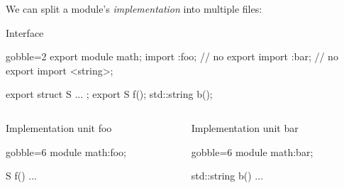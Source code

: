 \begin{frame}[fragile,shrink=5]
  \begin{block}{}
    We can split a module's \emph{implementation} into multiple files:
  \end{block}
  \begin{exampleblock}{Interface}
    \begin{cppcode*}{gobble=2}
      export module math;
      import :foo; // no export
      import :bar; // no export
      import <string>;

      export struct S { ... };
      export S f();
      std::string b();
    \end{cppcode*}
  \end{exampleblock}
  \vspace{-5mm}
  \begin{columns}[t]
    \begin{column}{.45\textwidth}
      \begin{exampleblock}{Implementation unit foo}
        \begin{cppcode*}{gobble=6}
          module math:foo;

          S f() { ... }
        \end{cppcode*}
      \end{exampleblock}
    \end{column}
    \begin{column}{.45\textwidth}
      \begin{exampleblock}{Implementation unit bar}
        \begin{cppcode*}{gobble=6}
          module math:bar;

          std::string b() { ... }
        \end{cppcode*}
      \end{exampleblock}
    \end{column}
  \end{columns}
\end{frame}

